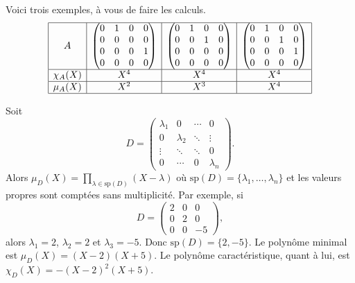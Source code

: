 \documentclass[12pt, class=report,crop=false]{standalone}
\newcommand{\Sp}{\text{sp}}
\begin{document}
\begin{exemple}
Voici trois exemples, à vous de faire les calculs.
\[
\begin{array}{|c|c|c|c|}
\hline
A & \begin{pmatrix}
0&1&0&0\\
0&0&0&0\\
0&0&0&1\\
0&0&0&0
\end{pmatrix}
 & 
\begin{pmatrix}
0&1&0&0\\
0&0&1&0\\
0&0&0&0\\
0&0&0&0
\end{pmatrix} & 
\begin{pmatrix}
0&1&0&0\\
0&0&1&0\\
0&0&0&1\\
0&0&0&0
\end{pmatrix}
\\\hline
\chi_A(X) & X^4 & X^4 & X^4\\\hline
\mu_A(X)&X^2&X^3& X^4\\\hline
\end{array}\]
\end{exemple}

\begin{exemple}
\label{ex:minidiag}
Soit 
\[
D = \begin{pmatrix}
\lambda_1& 0 & \cdots & 0\\
0 &\lambda_2& \ddots & \vdots\\
\vdots &\ddots& \ddots &0\\
0&\cdots&0& \lambda_n
\end{pmatrix}.\]
Alors $\mu_D(X) = \prod_{\lambda \in \Sp(D)}(X-\lambda)$ où $\Sp(D) = \{\lambda_1,\ldots,\lambda_n\}$ et les valeurs propres sont comptées sans multiplicité.
Par exemple, si 
\[
D = \begin{pmatrix}
2&0&0\\
0&2&0\\
0&0&-5
\end{pmatrix},\]
alors $\lambda_1= 2$, $\lambda_2 = 2$ et $\lambda_3 = -5$. Donc
$\Sp(D) = \{2,-5\}$. Le polynôme minimal est $\mu_D(X) = (X-2)(X+5)$. Le polynôme caractéristique,
 quant à lui, est $\chi_D(X) = -(X-2)^2(X+5)$.

\end{exemple}


\end{document}
